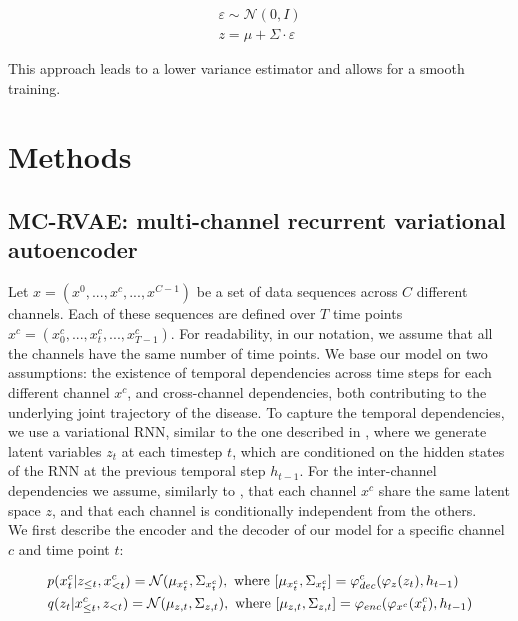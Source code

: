 \begin{equation}
\begin{split}
    \varepsilon \sim \mathcal{N}(0,I) \\
    z = \mu + \Sigma \cdot \varepsilon
\end{split}
\end{equation}

This approach leads to a lower variance estimator and allows for a smooth training.

\section{Methods}
\label{rnn:methods}

\subsection{MC-RVAE: multi-channel recurrent variational autoencoder}

Let $x = (x^0,...,x^c,...,x^{C-1})$ be a set of data sequences across $C$ different channels. Each of these sequences are defined over $T$ time points  $x^c = (x^c_{0},...,x^c_{t},...,x^c_{T-1})$. For readability, in our notation, we assume that all the channels have the same number of time points. We base our model on two assumptions: the existence of temporal dependencies across time steps for each different channel $x^c$, and cross-channel dependencies, both contributing to the underlying joint trajectory of the disease. To capture the temporal dependencies, we use a variational RNN, similar to the one described in \cite{Chung2015}, where we generate latent variables $z_t$ at each timestep $t$, which are conditioned on the hidden states of the RNN at the previous temporal step $h_{t-1}$. For the inter-channel dependencies we assume, similarly to \cite{Antelmi2019}, that each channel $x^c$ share the same latent space $z$, and that each channel is conditionally independent from the others. \\

We first describe the encoder and the decoder of our model for a specific channel $c$ and time point $t$:

\begin{equation} 
\begin{aligned} \label{rnn:eq:generative}
\displaystyle
& \mathit{p}(x^c_t | z_{\leq t}, x^c_{< t}) = \mathcal{N}(\mu_{x^c_t},\Sigma_{x^c_t}), \text{ where } [\mu_{x^c_t},\Sigma_{x^c_t}] = \varphi_{dec}^c(\varphi_{z}(z_t), h_{t-1}) \\
& \mathit{q}(z_t | x^c_{\leq t}, z_{< t}) = \mathcal{N}(\mu_{z,t},\Sigma_{z,t}), \text{ where } [ \mu_{z,t},\Sigma_{z,t}] = \varphi_{enc}(\varphi_{x^c}(x^c_{t}), h_{t-1}) \\
\end{aligned}
\end{equation}

